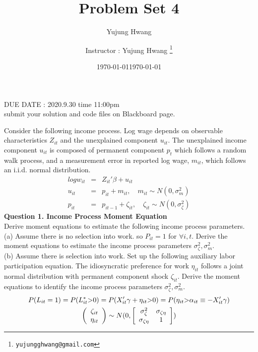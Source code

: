 \documentclass[paper=a4, fontsize=13pt]{extarticle} %
\author{Yujung Hwang} %
\date{\today} %
\numberwithin{equation}{section} %
\numberwithin{figure}{section} %
\numberwithin{table}{section} %
\begin{document}
\title{	
\normalfont \normalsize 
\huge Problem Set 4
}
\author{
Instructor : Yujung Hwang \thanks{\texttt{yujungghwang@gmail.com}}} %
\date{\today} %
\maketitle %

\begin{center}
DUE DATE : 2020.9.30 time 11:00pm \\
submit your solution and code files on Blackboard page.
\end{center}

\upshape \mdseries 
\normalsize

Consider the following income process. Log wage depends on observable characteristics $Z_{it}$ and the unexplained component $u_{it}$. The unexplained income component $u_{it}$ is composed of permanent component $p_t$ which follows a random walk process, and a measurement error in reported log wage, $m_{it}$, which follows an i.i.d. normal distribution.
\begin{eqnarray}
log w_{it} &=& Z_{it}'\beta + u_{it} \\
u_{it} &=& p_{it} + m_{it}, \quad m_{it} \sim N(0,\sigma_m^2) \\
p_{it} &=& p_{it-1} + \zeta_{it}, \quad \zeta_{it} \sim N(0,\sigma_{\zeta}^2) 
\end{eqnarray}
\vspace{0.2in}
\textbf{Question 1. Income Process Moment Equation} \\
Derive moment equations to estimate the following income process parameters. \\
(a) Assume there is no selection into work. so $P_{it} =1$ for $\forall i, t$. Derive the moment equations to estimate the income process parameters $\sigma_{\zeta}^2, \sigma_{m}^2$. \\
(b) Assume there is selection into work. Set up the following auxiliary labor participation equation. The idiosyncratic preference for work $\eta_{it}$ follows a joint normal distribution with permanent component shock $\zeta_{it}$. Derive the moment equations to identify the income process parameters $\sigma_{\zeta}^2, \sigma_m^2$.
\begin{gather}
P(L_{it} =1) = P(L_{it}^*\mbox{>}0) = P(X_{it}'\gamma + \eta_{it} \mbox{>} 0) = P(\eta_{it} \mbox{>} \alpha_{it} \equiv -X_{it}'\gamma) \\
\left(
\begin{array}{c}
\zeta_{it} \\
\eta_{it}
\end{array}
\right) \sim
N(0, 
\left[
\begin{array}{c c}
\sigma_{\zeta}^2 & \sigma_{\zeta \eta} \\
\sigma_{\zeta \eta} & 1
\end{array}
\right]
)
\end{gather}
\end{document}

